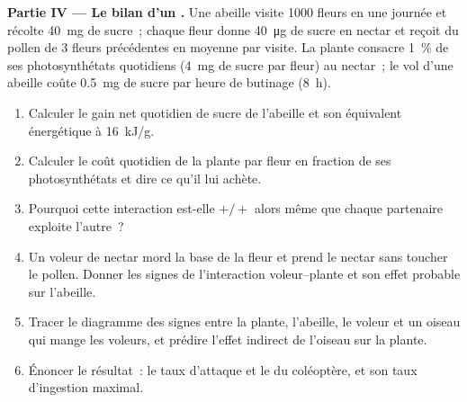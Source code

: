 \begin{problem}
\medskip
\noindent\textbf{Partie IV --- Le bilan d'un .}
Une abeille visite 1000 fleurs en une journée et récolte \qty{40}{mg}
de sucre~; chaque fleur donne \qty{40}{\micro g} de sucre en nectar et
reçoit du pollen de 3 fleurs précédentes en moyenne par visite. La
plante consacre \qty{1}{\%} de ses photosynthétats quotidiens
(\qty{4}{mg} de sucre par fleur) au nectar~; le vol d'une abeille coûte
\qty{0.5}{mg} de sucre par heure de butinage (\qty{8}{h}).
\begin{enumerate}[resume]
  \item Calculer le gain net quotidien de sucre de l'abeille et son
        équivalent énergétique à \qty{16}{kJ/g}.
  \item Calculer le coût quotidien de la plante par fleur en fraction
        de ses photosynthétats et dire ce qu'il lui achète.
  \item Pourquoi cette interaction est-elle $+/+$ alors même que chaque
        partenaire exploite l'autre~?
  \item Un voleur de nectar mord la base de la fleur et prend le nectar
        sans toucher le pollen. Donner les signes de l'interaction
        voleur--plante et son effet probable sur l'abeille.
  \item Tracer le diagramme des signes entre la plante, l'abeille, le
        voleur et un oiseau qui mange les voleurs, et prédire l'effet
        indirect de l'oiseau sur la plante.
  \item Énoncer le résultat~: le taux d'attaque et le  du coléoptère, et son taux d'ingestion maximal.
\end{enumerate}
\end{problem}
